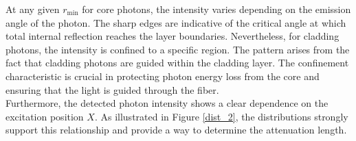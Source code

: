     At any given \( r_{\text{min}} \) for core photons, the intensity varies depending on the emission angle of the photon. The sharp edges are indicative of the critical angle at which total internal reflection reaches the layer boundaries. Nevertheless, for cladding photons, the intensity is confined to a specific region. The pattern arises from the fact that cladding photons are guided within the cladding layer. The confinement characteristic is crucial in protecting photon energy loss from the core and ensuring that the light is guided through the fiber. \\

    
    Furthermore, the detected photon intensity shows a clear dependence on the excitation position \( X \). As illustrated in Figure \ref{dist_2}, the distributions strongly support this relationship and provide a way to determine the attenuation length.
    
